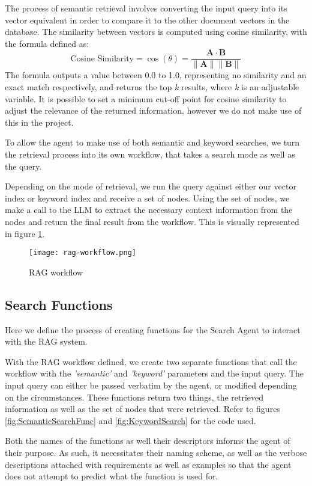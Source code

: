 The process of semantic retrieval involves converting the input query into its vector equivalent in order to compare it to the other document vectors in the database. The similarity between vectors is computed using cosine similarity, with the formula defined as:
\[
	\text{Cosine Similarity} = \cos(\theta) = \frac{\mathbf{A} \cdot \mathbf{B}}{\|\mathbf{A}\| \|\mathbf{B}\|}
\]
The formula outputs a value between 0.0 to 1.0, representing no similarity and an exact match respectively, and returns the top \textit{k} results, where \textit{k} is an adjustable variable.
It is possible to set a minimum cut-off point for cosine similarity to adjust the relevance of the returned information, however we do not make use of this in the project.

To allow the agent to make use of both semantic and keyword searches, we turn the retrieval process into its own workflow, that takes a search mode as well as the query.

Depending on the mode of retrieval, we run the query against either our vector index or keyword index and receive a set of nodes. Using the set of nodes, we make a call to the LLM to extract the necessary context information from the nodes and return the final result from the workflow.
This is visually represented in figure \ref{fig:RagWorkflow}.

\begin{figure}
	\centering
	\texttt{[image: rag-workflow.png]}
	\caption{RAG workflow}
	\label{fig:RagWorkflow}
\end{figure}


\subsection{Search Functions}
Here we define the process of creating functions for the Search Agent to interact with the RAG system.

With the RAG workflow defined, we create two separate functions that call the workflow with the \textit{'semantic'} and \textit{'keyword'} parameters and the input query. The input query can either be passed verbatim by the agent, or modified depending on the circumstances. These functions return two things, the retrieved information as well as the set of nodes that were retrieved. Refer to figures \ref{fig:SemanticSearchFunc} and
\ref{fig:KeywordSearch} for the code used.

Both the names of the functions as well their descriptors informs the agent of their purpose. As such, it necessitates their naming scheme, as well as the verbose descriptions attached with requirements as well as examples so that the agent does not attempt to predict what the function is used for.

